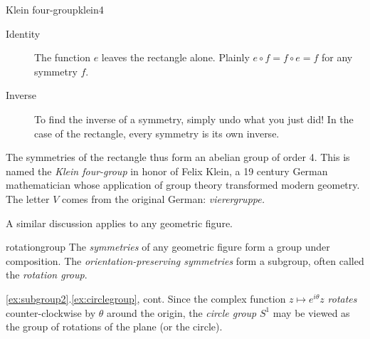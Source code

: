 \begin{example}{Klein four-group}{klein4}
\begin{description}
		\item[Identity] The function $e$ leaves the rectangle alone. Plainly $e\circ f=f\circ e=f$ for any symmetry $f$.
		\item[Inverse] To find the inverse of a symmetry, simply undo what you just did! In the case of the rectangle, every symmetry is its own inverse.
	\end{description}
	The symmetries of the rectangle thus form an abelian group of order 4. This is named the \emph{Klein four-group} in honor of Felix Klein, a 19\th{} century German mathematician whose application of group theory transformed modern geometry. The letter $V$ comes from the original German: \emph{vierergruppe.} 
\end{example}



\goodbreak


A similar discussion applies to any geometric figure.

\begin{thm}{}{rotationgroup}
	The \emph{symmetries} of any geometric figure form a group under composition.\smallbreak
	The \emph{orientation-preserving symmetries} form a subgroup, often called the \emph{rotation group}.\footnotemark{}
\end{thm}

\vspace{-8pt}


\begin{example*}{\ref*{ex:subgroup2}.\ref{ex:circlegroup}, cont.}{}
	Since the complex function $z\mapsto e^{i\theta}z$ \emph{rotates} counter-clockwise by $\theta$ around the origin, the \emph{circle group} $S^1$ may be viewed as the group of rotations of the plane (or the circle).
\end{example*}


